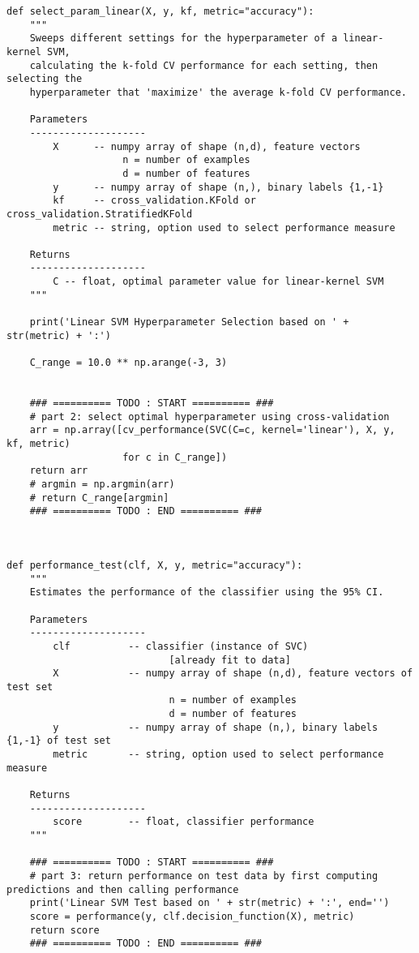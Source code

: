 \documentclass[11pt]{article}
\begin{document}
\begin{verbatim}
def select_param_linear(X, y, kf, metric="accuracy"):
    """
    Sweeps different settings for the hyperparameter of a linear-kernel SVM,
    calculating the k-fold CV performance for each setting, then selecting the
    hyperparameter that 'maximize' the average k-fold CV performance.
    
    Parameters
    --------------------
        X      -- numpy array of shape (n,d), feature vectors
                    n = number of examples
                    d = number of features
        y      -- numpy array of shape (n,), binary labels {1,-1}
        kf     -- cross_validation.KFold or cross_validation.StratifiedKFold
        metric -- string, option used to select performance measure
    
    Returns
    --------------------
        C -- float, optimal parameter value for linear-kernel SVM
    """
    
    print('Linear SVM Hyperparameter Selection based on ' + str(metric) + ':')

    C_range = 10.0 ** np.arange(-3, 3)

    
    ### ========== TODO : START ========== ###
    # part 2: select optimal hyperparameter using cross-validation
    arr = np.array([cv_performance(SVC(C=c, kernel='linear'), X, y, kf, metric) 
                    for c in C_range])
    return arr
    # argmin = np.argmin(arr)
    # return C_range[argmin]
    ### ========== TODO : END ========== ###



def performance_test(clf, X, y, metric="accuracy"):
    """
    Estimates the performance of the classifier using the 95% CI.
    
    Parameters
    --------------------
        clf          -- classifier (instance of SVC)
                            [already fit to data]
        X            -- numpy array of shape (n,d), feature vectors of test set
                            n = number of examples
                            d = number of features
        y            -- numpy array of shape (n,), binary labels {1,-1} of test set
        metric       -- string, option used to select performance measure
    
    Returns
    --------------------
        score        -- float, classifier performance
    """

    ### ========== TODO : START ========== ###
    # part 3: return performance on test data by first computing predictions and then calling performance
    print('Linear SVM Test based on ' + str(metric) + ':', end='')
    score = performance(y, clf.decision_function(X), metric)      
    return score
    ### ========== TODO : END ========== ###



\end{verbatim}
\end{document}
